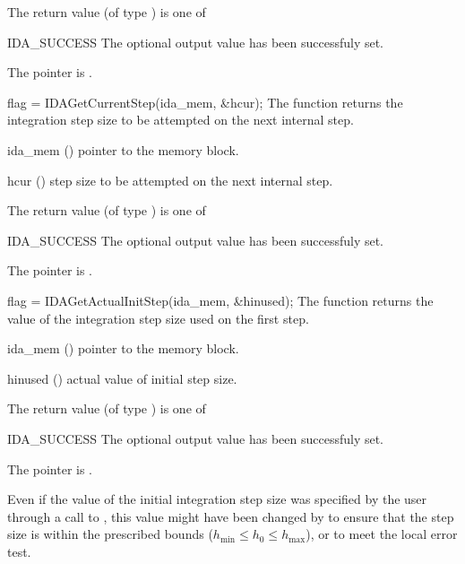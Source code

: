 {
  The return value  (of type ) is one of
  \begin{args}
  \item[IDA\_SUCCESS] 
    The optional output value has been successfuly set.
  \item[\Id{IDA\_MEM\_NULL}]
    The  pointer is .
  \end{args}
}
{}
{
  flag = IDAGetCurrentStep(ida\_mem, \&hcur);
}
{
  The function  returns the
  integration step size to be attempted on the next internal step.
}
{
  \begin{args}
  \item[ida\_mem] ()
    pointer to the {\ida} memory block.
  \item[hcur] ()
    step size to be attempted on the next internal step.
  \end{args}
}
{
  The return value  (of type ) is one of
  \begin{args}
  \item[IDA\_SUCCESS] 
    The optional output value has been successfuly set.
  \item[\Id{IDA\_MEM\_NULL}]
    The  pointer is .
  \end{args}
}
{}
{
  flag = IDAGetActualInitStep(ida\_mem, \&hinused);
}
{
  The function  returns the
  value of the integration step size used on the first step.
}
{
  \begin{args}
  \item[ida\_mem] ()
    pointer to the {\ida} memory block.
  \item[hinused] ()
    actual value of initial step size.
  \end{args}
}
{
  The return value  (of type ) is one of
  \begin{args}
  \item[IDA\_SUCCESS] 
    The optional output value has been successfuly set.
  \item[\Id{IDA\_MEM\_NULL}]
    The  pointer is .
  \end{args}
}
{
  Even if the value of the initial integration step size was specified
  by the user through a call to , this value might have 
  been changed by {\ida} to ensure that the step size is within the 
  prescribed bounds ($h_{\min} \le h_0 \le h_{\max}$), or to meet the
  local error test.
}
